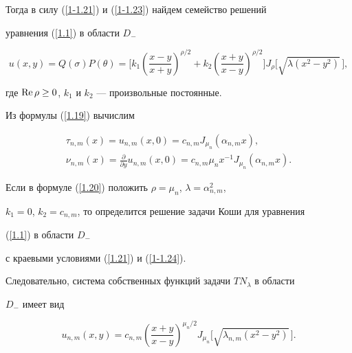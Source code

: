 Тогда в силу (\ref{1-1.21}) и (\ref{1-1.23}) найдем семейство решений 


уравнения (\ref{1.1}) в области $D_{-}$ 


\begin{equation}


u(x,y)=Q(\sigma)P(\theta)=\bigg[


k_1\left(\frac{x-y}{x+y}\right)^{\rho/2}+k_2\left(\frac{x+y}{x-y}


\right)^{\rho/2}\bigg]J_\rho


\big[\sqrt{\lambda(x^2-y^2)}\,\big],\label{1.20}


\end{equation}


где $\operatorname{Re} \rho\ge 0$, $k_1$ и $k_2$ --- произвольные постоянные.





Из формулы (\ref{1.19}) вычислим


\begin{gather}


\tau_{n,m}(x)=u_{n,m}(x,0)=c_{n,m}J_{\mu_n}(\alpha_{n,m}x),\label{1.21} \\


%


\nu_{n,m}(x)=\frac{\partial}{\partial y}u_{n,m}(x,0)=


c_{n,m}\mu_nx^{-1}J_{\mu_n}(\alpha_{n,m}x).\label{1-1.24}


\end{gather}





Если в формуле (\ref{1.20}) положить $\rho=\mu_n$, $\lambda=\alpha_{n,m}^2$,


$k_1=0$, $k_2=c_{n,m}$, то определится решение задачи Коши для уравнения 


(\ref{1.1}) в области $D_-$


с краевыми условиями (\ref{1.21}) и (\ref{1-1.24}).


Следовательно, система собственных функций задачи $TN_\lambda$ в области


$D_-$ имеет вид


\begin{equation}


u_{n,m}(x,y)=c_{n,m}\left(\frac{x+y}{x-y}\right)^{\mu_n/2}J_{\mu_n}\big[


\sqrt{\lambda_{n,m}(x^2-y^2)}\,\big].\label{1.22}


\end{equation}





